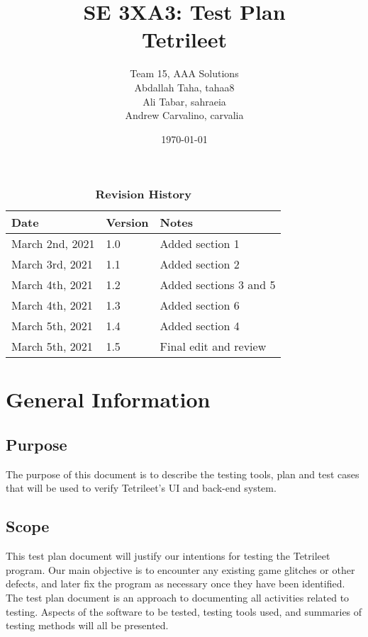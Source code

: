 \documentclass[12pt, titlepage]{article}
\title{SE 3XA3: Test Plan\\Tetrileet}
\author{Team 15, AAA Solutions
		\\ Abdallah Taha, tahaa8
		\\ Ali Tabar, sahraeia
		\\ Andrew Carvalino, carvalia
}
\date{\today}
\begin{document}
\maketitle

\tableofcontents
\listoftables
\listoffigures

\begin{table}[bp]
\caption{\bf Revision History}
\begin{tabularx}{\textwidth}{p{3cm}p{2cm}X}
\toprule {\bf Date} & {\bf Version} & {\bf Notes}\\
\midrule
March 2nd, 2021 & 1.0 & Added section 1\\
March 3rd, 2021 & 1.1 & Added section 2\\
March 4th, 2021 & 1.2 & Added sections 3 and 5\\
March 4th, 2021 & 1.3 & Added section 6\\
March 5th, 2021 & 1.4 & Added section 4\\
March 5th, 2021 & 1.5 & Final edit and review\\
\bottomrule
\end{tabularx}
\end{table}

\newpage


\section{General Information}

\subsection{Purpose}
The purpose of this document is to describe the testing tools, plan and test cases that will be used to verify Tetrileet's UI and back-end system.
\subsection{Scope}
This test plan document will justify our intentions for testing the Tetrileet program. Our main objective is to encounter any existing game glitches or other defects, and later fix the program as necessary once they have been identified.\\
The test plan document is an approach to documenting all activities related to testing. 
Aspects of the software to be tested, testing tools used, and summaries of testing methods will all be presented. 
\end{document}
